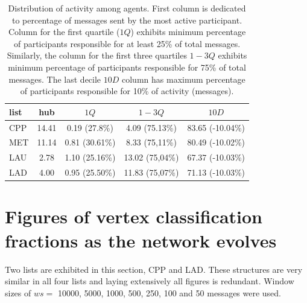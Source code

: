 \documentclass[%
 aip,
 jmp,%
 amsmath,amssymb,
 reprint,%
]{revtex4-1}
\begin{document}
\begin{table}
    \caption{Distribution of activity among agents. First column is dedicated to percentage of messages sent by the most active participant. Column for the first quartile ($1Q$) exhibits minimum percentage of participants responsible for at least 25\% of total messages. Similarly, the column for the first three quartiles $1-3Q$ exhibits minimum percentage of participants responsible for 75\% of total messages. The last decile $10D$ column has maximum percentage of participants responsible for 10\% of activity (messages).}
\begin{center}
    \begin{tabular}{ | l ||  c | c | c | c | }
        \hline
        list & hub & $ 1Q $ & $ 1-3Q $ & $10D$ \\ \hline
    CPP & 14.41 & 0.19 (27.8\%) & 4.09 (75.13\%) & 83.65 (-10.04\%)   \\ 
    MET & 11.14 & 0.81 (30.61\%) & 8.33 (75,11\%) & 80.49 (-10.02\%)  \\ 
    LAU & 2.78 & 1.10 (25.16\%) & 13.02 (75,04\%) & 67.37 (-10.03\%) \\ 
    LAD & 4.00 & 0.95 (25.50\%) & 11.83 (75,07\%) & 71.13 (-10.03\%) \\\hline
    \end{tabular}
\end{center}
\label{autores}
\end{table}



\clearpage
\section{Figures of vertex classification fractions as the network evolves}\label{figures}

Two lists are exhibited in this section, CPP and LAD. These structures are very similar in all
four lists and laying extensively all figures is redundant. Window sizes of $ws =$ 10000, 5000,
1000, 500, 250, 100 and 50 messages were used.
\end{document}

